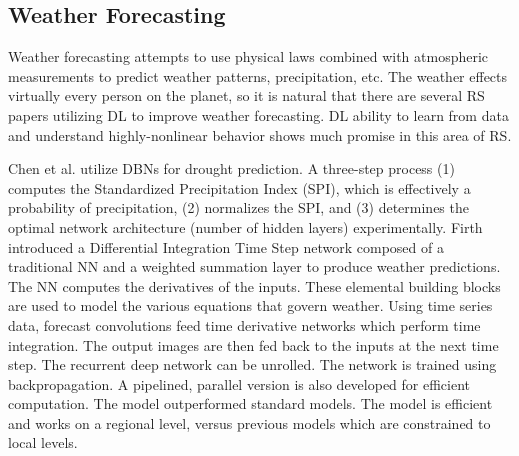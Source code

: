 \documentclass[12pt]{spieman}
\begin{document}
\begin{spacing}{1}
\subsection{Weather Forecasting}

Weather forecasting attempts to use physical laws combined with atmospheric measurements to predict weather patterns, precipitation, etc. The weather effects virtually every person on the planet, so it is natural that there are several RS papers utilizing DL to improve weather forecasting. DL ability to learn from data and understand highly-nonlinear behavior shows much promise in this area of RS.

Chen et al. \cite{chen2012design} utilize DBNs for drought prediction. A three-step process (1) computes the Standardized Precipitation Index (SPI), which is effectively a probability of precipitation, (2) normalizes the SPI, and (3) determines the optimal network architecture (number of hidden layers) experimentally. Firth \cite{firth2016novel} introduced a Differential Integration Time Step network composed of a traditional NN and a weighted summation layer to produce weather predictions. The NN computes the derivatives of the inputs. These elemental building blocks are used to model the various equations that govern weather. Using time series data, forecast convolutions feed time derivative networks which perform time integration. The output images are then fed back to the inputs at the next time step. The recurrent deep network can be unrolled. The network is trained using backpropagation. A pipelined, parallel version is also developed for efficient computation. The model outperformed standard models. The model is efficient and works on a regional level, versus previous models which are constrained to local levels.


\end{spacing}
\end{document}
